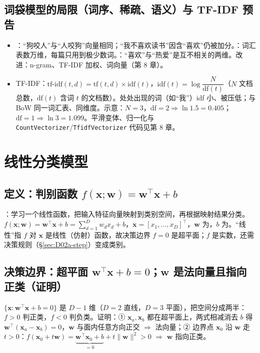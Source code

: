 \subsection{词袋模型的局限（词序、稀疏、语义）与 TF-IDF 预告}
\begin{itemize}
\item {}：“狗咬人”与“人咬狗”向量相同；“我不喜欢读书”因含“喜欢”仍被加分。：词汇表数万维，每篇只用到极少数词。：“喜欢”与“热爱”是互不相关的两维。改进：n-gram、TF-IDF 加权、词向量（第 8 章）。
\item TF-IDF：$\text{tf-idf}(t,d)=\text{tf}(t,d)\times\text{idf}(t)$，$\text{idf}(t)=\log\dfrac{N}{\text{df}(t)}$（$N$ 文档总数，$\text{df}(t)$ 含词 $t$ 的文档数）。处处出现的词（如“我”）idf 小、被压低；与 BoW 同一词汇表、同维度。示意：$N=3$，$\text{df}=2\Rightarrow\ln1.5=0.405$；$\text{df}=1\Rightarrow\ln3=1.099$。平滑变体、归一化与 \texttt{CountVectorizer}/\texttt{TfidfVectorizer} 代码见第 8 章。
\end{itemize}

\section{线性分类模型}

\subsection{定义：判别函数 \texorpdfstring{$f(\bm x;\bm w)=\bm w^\top\bm x+b$}{f(x;w)=w'x+b}}
：学习一个线性函数，把输入特征向量映射到类别空间，再根据映射结果分类。 $f(\bm x;\bm w)=\bm w^\top\bm x+b=\sum_{d=1}^D w_dx_d+b$，$\bm x=[x_1,\dots,x_D]^\top$，$\bm w$ 为，$b$ 为。“线性”指 $f$ 对 $\bm x$ 是线性（仿射）函数，故决策边界 $f=0$ 是超平面；$f$ 是实数，还需决策规则（§\ref{sec:D02a-step}）变成类别。

\subsection{决策边界：超平面 \texorpdfstring{$\bm w^\top\bm x+b=0$}{w'x+b=0}；\texorpdfstring{$\bm w$}{w} 是法向量且指向正类（证明）}
$\{\bm x:\bm w^\top\bm x+b=0\}$ 是 $D-1$ 维（$D=2$ 直线，$D=3$ 平面），把空间分成两半：$f>0$ 判正类，$f<0$ 判负类。证明：① $\bm x_a,\bm x_b$ 都在超平面上，两式相减消去 $b$ 得 $\bm w^\top(\bm x_a-\bm x_b)=0$，$\bm w$ 与面内任意方向正交 $\Rightarrow$ 法向量；② 边界点 $\bm x_0$ 沿 $\bm w$ 走 $t>0$：$f(\bm x_0+t\bm w)=\underbrace{\bm w^\top\bm x_0+b}_{=0}+t\|\bm w\|^2>0$ $\Rightarrow$ $\bm w$ 指向正类。

